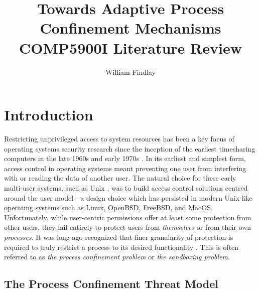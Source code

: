 \documentclass[dvipsnames, 12pt]{article}
\title{\huge Towards Adaptive Process Confinement
Mechanisms\\{\large COMP5900I Literature Review}}
\author{William Findlay}
\begin{document}
\maketitle
\thispagestyle{plain}


\setcounter{page}{1}

\vfill
\begin{abstract}
\end{abstract}
\vfill
\vfill

\clearpage


\section{Introduction}

Restricting unprivileged access to system resources has been a key focus of
operating systems security research since the inception of the earliest
timesharing computers in the late 1960s and early 1970s . In its
earliest and simplest form, access control in operating systems meant preventing
one user from interfering with or reading the data of another user. The natural
choice for these early multi-user systems, such as Unix \cite{ritchie1973_unix},
was to build access control solutions centred around the user model---a design
choice which has persisted in modern Unix-like operating systems such as Linux,
OpenBSD, FreeBSD, and MacOS. Unfortunately, while user-centric permissions offer
at least some protection from other users, they fail entirely to protect users
from \textit{themselves} or from their own \textit{processes}.  It was long ago
recognized that finer granularity of protection is required to truly restrict
a process to its desired functionality \cite{lampson1973_a_note}. This is often
referred to as \textit{the process confinement problem} or \textit{the
sandboxing problem}.

\subsection{The Process Confinement Threat Model}
\end{document}
